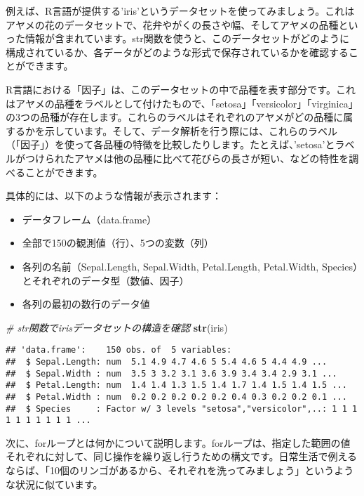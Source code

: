 \documentclass[
]{article}
\newenvironment{Shaded}{\begin{snugshade}}{\end{snugshade}}
\newcommand{\CommentTok}[1]{\textcolor[rgb]{0.56,0.35,0.01}{\textit{#1}}}
\newcommand{\FunctionTok}[1]{\textcolor[rgb]{0.13,0.29,0.53}{\textbf{#1}}}
\newcommand{\NormalTok}[1]{#1}
\providecommand{\tightlist}{%
  \setlength{\itemsep}{0pt}\setlength{\parskip}{0pt}}
\begin{document}
例えば、R言語が提供する'iris'というデータセットを使ってみましょう。これはアヤメの花のデータセットで、花弁やがくの長さや幅、そしてアヤメの品種といった情報が含まれています。str関数を使うと、このデータセットがどのように構成されているか、各データがどのような形式で保存されているかを確認することができます。

R言語における「因子」は、このデータセットの中で品種を表す部分です。これはアヤメの品種をラベルとして付けたもので、「setosa」「versicolor」「virginica」の3つの品種が存在します。これらのラベルはそれぞれのアヤメがどの品種に属するかを示しています。そして、データ解析を行う際には、これらのラベル（「因子」）を使って各品種の特徴を比較したりします。たとえば、'setosa'とラベルがつけられたアヤメは他の品種に比べて花びらの長さが短い、などの特性を調べることができます。

具体的には、以下のような情報が表示されます：

\begin{itemize}
\tightlist
\item
  データフレーム（data.frame）
\item
  全部で150の観測値（行）、5つの変数（列）
\item
  各列の名前（Sepal.Length, Sepal.Width, Petal.Length, Petal.Width,
  Species）とそれぞれのデータ型（数値、因子）
\item
  各列の最初の数行のデータ値
\end{itemize}

\begin{Shaded}
\begin{Highlighting}[]
\CommentTok{\# str関数でirisデータセットの構造を確認}
\FunctionTok{str}\NormalTok{(iris)}
\end{Highlighting}
\end{Shaded}

\begin{verbatim}
## 'data.frame':    150 obs. of  5 variables:
##  $ Sepal.Length: num  5.1 4.9 4.7 4.6 5 5.4 4.6 5 4.4 4.9 ...
##  $ Sepal.Width : num  3.5 3 3.2 3.1 3.6 3.9 3.4 3.4 2.9 3.1 ...
##  $ Petal.Length: num  1.4 1.4 1.3 1.5 1.4 1.7 1.4 1.5 1.4 1.5 ...
##  $ Petal.Width : num  0.2 0.2 0.2 0.2 0.2 0.4 0.3 0.2 0.2 0.1 ...
##  $ Species     : Factor w/ 3 levels "setosa","versicolor",..: 1 1 1 1 1 1 1 1 1 1 ...
\end{verbatim}

次に、forループとは何かについて説明します。forループは、指定した範囲の値それぞれに対して、同じ操作を繰り返し行うための構文です。日常生活で例えるならば、「10個のリンゴがあるから、それぞれを洗ってみましょう」というような状況に似ています。
\end{document}
